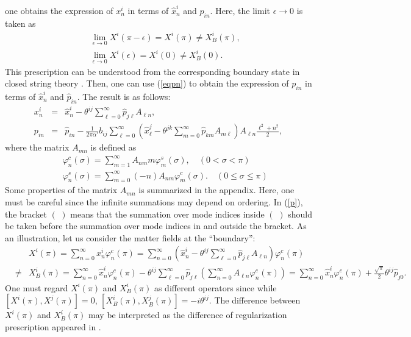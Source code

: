 \documentclass[a4paper,12pt]{article}
\newcommand{\nn}{\nonumber\\}
\newcommand{\co}{\varphi^c}
\newcommand{\si}{\varphi^s}
\newcommand{\e}{\epsilon}
\newcommand{\XB}{X_B}
\begin{document}
one obtains the expression of 
$x^i_n$ in terms of 
$\hat{x}^i_n$ and $\hat{p}_{in}$.
Here, the limit $\epsilon \rightarrow 0$ is taken 
as
\begin{eqnarray}
 \label{limitF}
&& \lim_{\e \rightarrow 0}
X^i (\pi-\e) = X^i(\pi) \ne \XB^i (\pi), \nn
&& \lim_{\e \rightarrow 0}
X^i (\e) = X^i(0) \ne \XB^i (0) .
\end{eqnarray}
This prescription can be understood
from the corresponding boundary state 
in closed string theory \cite{Ish}\cite{Wilson,OkuB}.
Then, one can use (\ref{eqpn})
to obtain the
expression of $p_{in}$ in terms of
$\hat{x}^i_n$ and $\hat{p}_{in}$.
The result is as follows:
\begin{eqnarray}
x_n^i &=& 
\hat{x}_n^i 
- \theta^{ij} \sum_{\ell=0}^\infty \hat{p}_{j \ell} A_{\ell n} ,
\label{x} \\
p_{i n}&=&
\hat{p}_{i n}
-\frac{1}{2\pi\alpha'} b_{ij}
\sum_{\ell = 0}^\infty 
\left(
\hat{x}^j_\ell 
- 
\theta^{jk} 
\sum_{m=0}^\infty \hat{p}_{k m} A_{m \ell} 
\right)
A_{\ell n} \frac{\ell^2+n^2}{2},
\label{p}
\end{eqnarray}
where the matrix $A_{mn}$ is defined as
\begin{eqnarray}
 \label{cosi}
&&\co_n(\sigma) = \sum_{m=1}^\infty A_{nm} m \si_m(\sigma), 
\quad (0<\sigma<\pi) \nn
&&\si_n(\sigma) = \sum_{m=0}^\infty (-n) A_{nm}  \co_m(\sigma) .
\quad (0 \leq \sigma \leq \pi)
\end{eqnarray}
Some properties of the matrix
$A_{mn}$ is summarized 
in the appendix.
Here, one
must be careful since the infinite summations
may depend on ordering.
In (\ref{p}),
the bracket $(\,\,)$ means that 
the summation over mode indices inside
$(\,\,)$
should be taken before the summation over mode indices 
in and outside the bracket.
As an illustration, let us consider
the matter fields at the 
``boundary'':
\begin{eqnarray}
 \label{boundary}
&&X^i (\pi) = 
\sum_{n=0}^\infty
x^i_n \co_n (\pi)
=
\sum_{n=0}^\infty
\left(\hat{x}^i_n - 
\theta^{ij} \sum_{\ell = 0}^\infty \hat{p}_{j\ell} A_{\ell n}
\right) \co_n (\pi) \\
&\ne&
\XB^i (\pi)
=
\sum_{n=0}^\infty
\hat{x}^i_n \co_n(\pi)- 
\theta^{ij} \sum_{\ell = 0}^\infty \hat{p}_{j\ell} 
\left(
\sum_{n=0}^\infty
A_{\ell n}
\co_n (\pi)
\right)
=
\sum_{n=0}^\infty
\hat{x}^i_n \co_n(\pi)
+
\frac{\sqrt{\pi}}{2} 
\theta^{ij}
\hat{p}_{j0}. \nonumber
\end{eqnarray}
One must regard 
$X^i(\pi)$ and $\XB^i(\pi)$ as
different operators
since 
while $[X^i(\pi), X^j(\pi)]=0$,
$[\XB^i(\pi), \XB^j(\pi)] = - i \theta^{ij}$.
The difference between $X^i(\pi)$ and $\XB^i(\pi)$
may be interpreted as the difference of regularization
prescription appeared in \cite{NCSW}.
\end{document}
